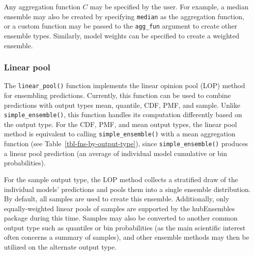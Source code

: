 \documentclass[
  letterpaper,
  DIV=11,
  numbers=noendperiod]{scrartcl}
\begin{document}
Any aggregation function \(C\) may be specified by the user. For
example, a median ensemble may also be created by specifying
\texttt{median} as the aggregation function, or a custom function may be
passed to the \texttt{agg\_fun} argument to create other ensemble types.
Similarly, model weights can be specified to create a weighted ensemble.

\subsubsection{Linear pool}\label{sec-linear-pool}

The \texttt{linear\_pool()} function implements the linear opinion pool
(LOP) method for ensembling predictions. Currently, this function can be
used to combine predictions with output types mean, quantile, CDF, PMF,
and sample. Unlike \texttt{simple\_ensemble()}, this function handles
its computation differently based on the output type. For the CDF, PMF,
and mean output types, the linear pool method is equivalent to calling
\texttt{simple\_ensemble()} with a mean aggregation function (see
Table~\ref{tbl-fns-by-output-type}), since \texttt{simple\_ensemble()}
produces a linear pool prediction (an average of individual model
cumulative or bin probabilities).

For the sample output type, the LOP method collects a stratified draw of
the individual models' predictions and pools them into a single ensemble
distribution. By default, all samples are used to create this ensemble.
Additionally, only equally-weighted linear pools of samples are
supported by the {hubEnsembles} package during this time. Samples may
also be converted to another common output type such as quantiles or bin
probabilities (as the main scientific interest often concerns a summary
of samples), and other ensemble methods may then be utilized on the
alternate output type.
\end{document}
